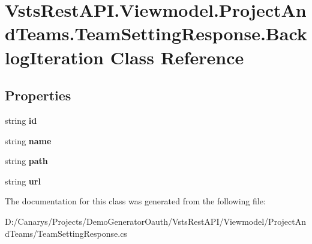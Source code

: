 \hypertarget{class_vsts_rest_a_p_i_1_1_viewmodel_1_1_project_and_teams_1_1_team_setting_response_1_1_backlog_iteration}{}\section{Vsts\+Rest\+A\+P\+I.\+Viewmodel.\+Project\+And\+Teams.\+Team\+Setting\+Response.\+Backlog\+Iteration Class Reference}
\label{class_vsts_rest_a_p_i_1_1_viewmodel_1_1_project_and_teams_1_1_team_setting_response_1_1_backlog_iteration}
\subsection*{Properties}
\begin{DoxyCompactItemize}
\item 
\mbox{\label{class_vsts_rest_a_p_i_1_1_viewmodel_1_1_project_and_teams_1_1_team_setting_response_1_1_backlog_iteration_a400170499c4c32cc8cc695a2f9daf4d7}} 
string {\bfseries id}
\item 
\mbox{\label{class_vsts_rest_a_p_i_1_1_viewmodel_1_1_project_and_teams_1_1_team_setting_response_1_1_backlog_iteration_a0fbee32ba8600b0325f2f183a4c00d4a}} 
string {\bfseries name}
\item 
\mbox{\label{class_vsts_rest_a_p_i_1_1_viewmodel_1_1_project_and_teams_1_1_team_setting_response_1_1_backlog_iteration_ae59ff3ce86f2331d64cae2edbaacea2f}} 
string {\bfseries path}
\item 
\mbox{\label{class_vsts_rest_a_p_i_1_1_viewmodel_1_1_project_and_teams_1_1_team_setting_response_1_1_backlog_iteration_aa67513791bdc29d1826fd6838f0ba281}} 
string {\bfseries url}
\end{DoxyCompactItemize}


The documentation for this class was generated from the following file\+:\begin{DoxyCompactItemize}
\item 
D\+:/\+Canarys/\+Projects/\+Demo\+Generator\+Oauth/\+Vsts\+Rest\+A\+P\+I/\+Viewmodel/\+Project\+And\+Teams/Team\+Setting\+Response.\+cs\end{DoxyCompactItemize}
